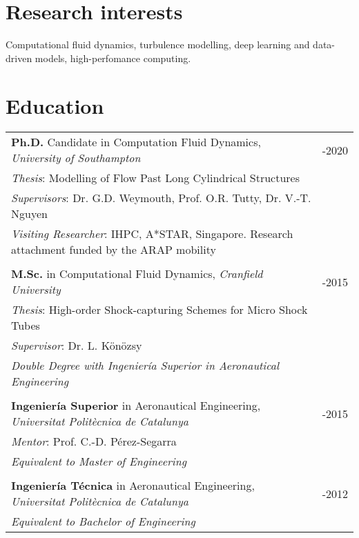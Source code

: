 \documentclass[line]{res}
\newenvironment{p}
  {\begin{adjustwidth}{-10pt}{0pt}}
  {\end{adjustwidth}}
\newenvironment{p3}
  {\begin{adjustwidth}{-16pt}{0pt}
  \vspace{3pt}}
  {\end{adjustwidth}}
\begin{document}


\begin{resume}
\section{}
\vspace{-15pt} 
\hfill

\noindent

\section{Research interests}
\begin{p}
Computational fluid dynamics, turbulence modelling, deep learning and data-driven models, high-perfomance computing. 
\end{p}
 
\section{Education}
\begin{p3}
\begin{tabular}{p{} >{\raggedleft\arraybackslash}p{}}
\textbf{Ph.D.} Candidate in Computation Fluid Dynamics, \textit{University of Southampton} &  2015-2020\\
\textit{Thesis}: Modelling of Flow Past Long Cylindrical Structures & \\
\textit{Supervisors}: Dr. G.D. Weymouth, Prof. O.R. Tutty, Dr. V.-T. Nguyen & \\
\textit{Visiting Researcher}: IHPC, A*STAR, Singapore. Research attachment funded by the ARAP mobility&  \\
\\
\textbf{M.Sc. }in Computational Fluid Dynamics, \textit{Cranfield University} &  2014-2015\\ 
\textit{Thesis}: High-order Shock-capturing Schemes for Micro Shock Tubes & \\
\textit{Supervisor}: Dr. L. K\"{o}n\"{o}zsy & \\
\textit{Double Degree with Ingenier\'{i}a Superior in Aeronautical Engineering} & \\
\\
\textbf{Ingenier\'{i}a Superior} in Aeronautical Engineering, \textit{Universitat Polit\`{e}cnica de Catalunya} &  2012-2015\\ 
\textit{Mentor}: Prof. C.-D. P\'{e}rez-Segarra & \\
\textit{Equivalent to Master of Engineering} & \\
\\
\textbf{Ingenier\'{i}a T\'{e}cnica} in Aeronautical Engineering, \textit{Universitat Polit\`{e}cnica de Catalunya} &  2009-2012\\ 
\textit{Equivalent to Bachelor of Engineering} & 
\end{tabular}
\end{p3}



\end{resume}
\end{document}
